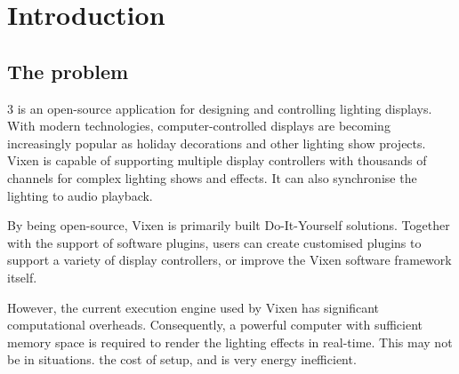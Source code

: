 \chapter{Introduction}
\renewcommand{\baselinestretch}{\mystretch}
\label{chap:Intro}

\section{The problem}

 3 \cite{vixen} is an open-source application for designing and controlling  lighting displays. With modern technologies, computer-controlled displays are becoming increasingly popular as holiday decorations and other lighting show projects. Vixen is capable of supporting multiple display controllers with thousands of channels for complex lighting shows and effects. It can also synchronise the lighting  to audio playback.

By being open-source, Vixen is primarily built  Do-It-Yourself solutions. Together with the support of software plugins, users can create customised plugins to support a variety of display controllers, or improve the Vixen software framework itself.

However, the current execution engine used by Vixen has significant computational overheads. Consequently, a powerful computer with sufficient memory space is required to render the lighting effects in real-time. This may not be  in  situations.  the cost of  setup, and is very energy inefficient.

\clearpage




